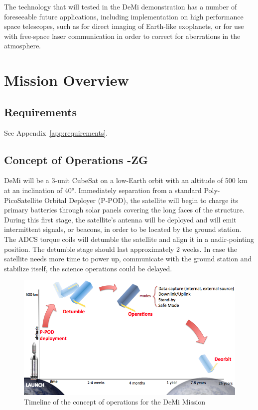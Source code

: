 \documentclass[12pt]{article}
\begin{document}
The technology that will tested in the DeMi demonstration has a number of foreseeable future applications, including implementation on high performance space telescopes, such as for direct imaging of Earth-like exoplanets, or for use with free-space laser communication in order to correct for aberrations in the atmosphere. 

\section{Mission Overview}
		\subsection{Requirements}
		
		See Appendix~\ref{app:requirements}.
		
		\subsection{Concept of Operations -ZG}
		
		DeMi will be a 3-unit CubeSat on a low-Earth orbit with an altitude of 500 km at an inclination of 40°. Immediately separation from a standard Poly-PicoSatellite Orbital Deployer (P-POD), the satellite will begin to charge its primary batteries through solar panels covering the long faces of the structure. During this first stage, the satellite’s antenna will be deployed and will emit intermittent signals, or beacons, in order to be located by the ground station. The ADCS torque coils will detumble the satellite and align it in a nadir-pointing position. The detumble stage should last approximately 2 weeks. In case the satellite needs more time to power up, communicate with the ground station and stabilize itself, the science operations could be delayed. 
		
		\begin{figure}[!ht]
				\centering
				\includegraphics[width=5in]{images/MissionOverview_1.png}
				\caption{Timeline of the concept of operations for the DeMi Mission}
				\label{fig:Mission_ConOps}
			\end{figure}
		
\end{document}
